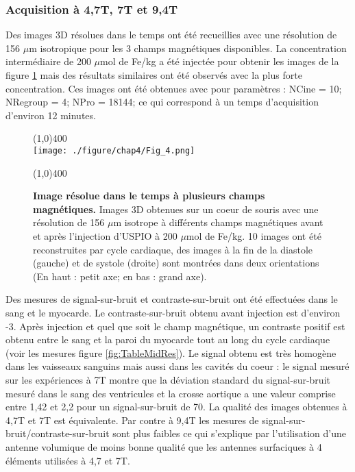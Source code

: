 \subsubsection{Acquisition à 4,7T, 7T et 9,4T}

Des images 3D résolues dans le temps ont été recueillies avec une résolution de 156 $\mu$m isotropique pour les 3 champs magnétiques disponibles. La concentration intermédiaire de 200 $\mu$mol de Fe/kg a été injectée pour obtenir les images de la figure \ref{fig:UTEUSPIOField} mais des résultats similaires ont été observés avec la plus forte concentration. Ces images ont été obtenues avec pour paramètres : NCine = 10; NRegroup = 4; NPro = 18144; ce qui correspond à un temps d'acquisition d'environ 12 minutes.

\begin{figure}[H]
\centering
\line(1,0){400} \\
\texttt{[image: ./figure/chap4/Fig\_4.png]}
\caption[Image résolue dans le temps à plusieurs champs magnétiques.]{\label{fig:UTEUSPIOField} \textbf{Image résolue dans le temps à plusieurs champs magnétiques.} Images 3D obtenues sur un coeur de souris avec une résolution de 156 $\mu$m isotrope à différents champs magnétiques avant et après l'injection d'USPIO à 200 $\mu$mol de Fe/kg. 10 images ont été reconstruites par cycle cardiaque, des images à la fin de la diastole (gauche) et de systole (droite) sont montrées dans deux orientations (En haut : petit axe; en bas : grand axe).}
\line(1,0){400} \\ 
\end{figure}

Des mesures de signal-sur-bruit et contraste-sur-bruit ont été effectuées dans le sang et le myocarde. Le contraste-sur-bruit obtenu avant injection est d'environ -3. Après injection et quel que soit le champ magnétique, un contraste positif est obtenu entre le sang et la paroi du myocarde tout au long du cycle cardiaque (voir les mesures figure \ref{fig:TableMidRes}). Le signal obtenu est très homogène dans les vaisseaux sanguins mais aussi dans les cavités du coeur : le signal mesuré sur les expériences à 7T montre que la déviation standard du signal-sur-bruit mesuré dans le sang des ventricules et la crosse aortique a une valeur comprise entre 1,42 et 2,2 pour un signal-sur-bruit de 70. La qualité des images obtenues à 4,7T et 7T est équivalente. Par contre à 9,4T les mesures de signal-sur-bruit/contraste-sur-bruit sont plus faibles ce qui s'explique par l'utilisation d'une antenne volumique de moins bonne qualité que les antennes surfaciques à 4 éléments utilisées à 4,7 et 7T.


